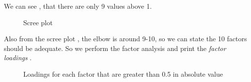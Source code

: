 We can see , that there are only 9 values above 1.

\begin{figure}[H]
    \label{fig:scree}
    \caption{Scree plot} 
\end{figure}

Also from the scree plot , the elbow is around 9-10, so we can state the 10 factors should be adequate.
So we perform the factor analysis and print the \textit{factor loadings} .

\begin{figure}[H]
    \label{fig:loadings}
    \caption{Loadings for each factor that are greater than 0.5 in absolute value} 
\end{figure}

